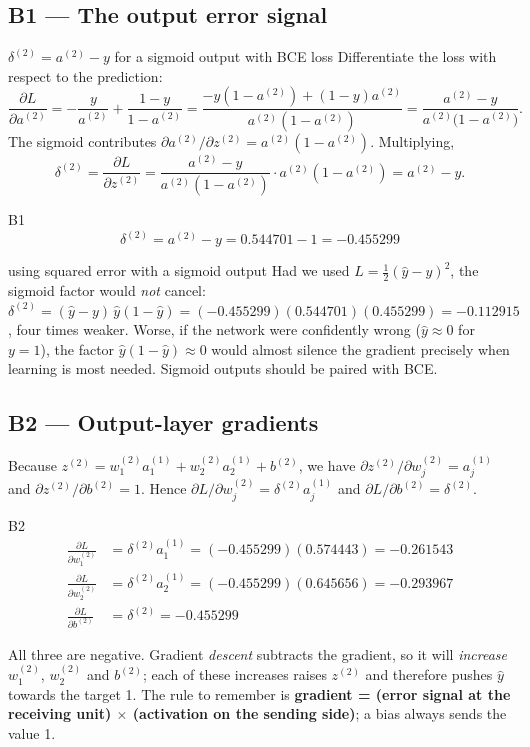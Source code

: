 \documentclass[11pt]{article}
\begin{document}
\subsection{B1 --- The output error signal}
\begin{derivation}{$\delta^{(2)}=a^{(2)}-y$ for a sigmoid output with BCE loss}
Differentiate the loss with respect to the prediction:
\[
\frac{\partial L}{\partial a^{(2)}}=-\frac{y}{a^{(2)}}+\frac{1-y}{1-a^{(2)}}
=\frac{-y(1-a^{(2)})+(1-y)a^{(2)}}{a^{(2)}(1-a^{(2)})}
=\frac{a^{(2)}-y}{a^{(2)}\bigl(1-a^{(2)}\bigr)} .
\]
The sigmoid contributes $\partial a^{(2)}/\partial z^{(2)}=a^{(2)}(1-a^{(2)})$. Multiplying,
\[
\delta^{(2)}=\frac{\partial L}{\partial z^{(2)}}=\frac{a^{(2)}-y}{a^{(2)}(1-a^{(2)})}\cdot a^{(2)}(1-a^{(2)})=a^{(2)}-y .
\]
\end{derivation}
\begin{example}{B1}
\[
\delta^{(2)}=a^{(2)}-y=0.544701-1=\mathbf{-0.455299}
\]
\end{example}
\begin{pitfall}{using squared error with a sigmoid output}
Had we used $L=\tfrac12(\hat y-y)^2$, the sigmoid factor would \emph{not} cancel: $\delta^{(2)}=(\hat y-y)\,\hat y(1-\hat y)=(-0.455299)(0.544701)(0.455299)=-0.112915$, four times weaker. Worse, if the network were confidently wrong ($\hat y\approx0$ for $y=1$), the factor $\hat y(1-\hat y)\approx0$ would almost silence the gradient precisely when learning is most needed. Sigmoid outputs should be paired with BCE.
\end{pitfall}

\subsection{B2 --- Output-layer gradients}
Because $z^{(2)}=w^{(2)}_1a^{(1)}_1+w^{(2)}_2a^{(1)}_2+b^{(2)}$, we have $\partial z^{(2)}/\partial w^{(2)}_j=a^{(1)}_j$ and $\partial z^{(2)}/\partial b^{(2)}=1$. Hence $\partial L/\partial w^{(2)}_j=\delta^{(2)}a^{(1)}_j$ and $\partial L/\partial b^{(2)}=\delta^{(2)}$.
\begin{example}{B2}
\begin{align*}
\frac{\partial L}{\partial w^{(2)}_1}&=\delta^{(2)}a^{(1)}_1=(-0.455299)(0.574443)=\mathbf{-0.261543}\\[2pt]
\frac{\partial L}{\partial w^{(2)}_2}&=\delta^{(2)}a^{(1)}_2=(-0.455299)(0.645656)=\mathbf{-0.293967}\\[2pt]
\frac{\partial L}{\partial b^{(2)}}&=\delta^{(2)}=\mathbf{-0.455299}
\end{align*}
\end{example}
All three are negative. Gradient \emph{descent} subtracts the gradient, so it will \emph{increase} $w^{(2)}_1$, $w^{(2)}_2$ and $b^{(2)}$; each of these increases raises $z^{(2)}$ and therefore pushes $\hat y$ towards the target 1. The rule to remember is \textbf{gradient = (error signal at the receiving unit) $\times$ (activation on the sending side)}; a bias always sends the value 1.
\end{document}
